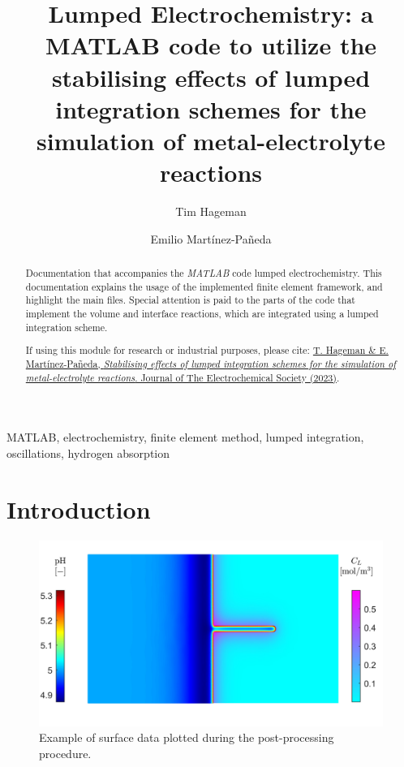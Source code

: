 \documentclass[3p]{elsarticle} %
\newcommand{\citeMe}{\href{http://www.doi.org/10.1149/1945-7111/acb971}{T. Hageman \& E. Martínez-Pañeda, \textit{Stabilising effects of lumped integration schemes for the simulation of metal-electrolyte reactions}. Journal of The Electrochemical Society (2023)}}
\begin{document}
\begin{frontmatter}
\title{Lumped Electrochemistry: a MATLAB code to utilize the stabilising effects of lumped integration schemes for the simulation of metal-electrolyte reactions}

\author{Tim Hageman }
\author{Emilio Martínez-Pañeda}

\address{Department of Civil and Environmental Engineering, Imperial College London, London SW7 2AZ, UK}

\begin{abstract}
Documentation that accompanies the \textit{MATLAB} code lumped electrochemistry. This documentation explains the usage of the implemented finite element framework, and highlight the main files. Special attention is paid to the parts of the code that implement the volume and interface reactions, which are integrated using a lumped integration scheme. 

If using this module for research or industrial purposes, please cite: \citeMe{}.
\end{abstract}

\begin{keyword}
MATLAB, electrochemistry, finite element method, lumped integration, oscillations, hydrogen absorption
\end{keyword}

\end{frontmatter}

\tableofcontents

\section{Introduction}
\begin{figure}
    \centering
    \includegraphics[width=12cm]{../Figures/SurfacePlot.jpg}
    \caption{Example of surface data plotted during the post-processing procedure.}
    \label{fig:example_surf}
\end{figure}
\end{document}
